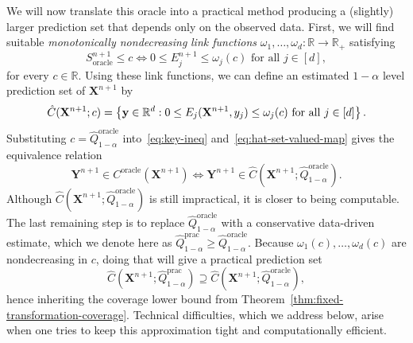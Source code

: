 {We will now translate this oracle into a practical method producing a (slightly) larger prediction set that depends only on the observed data. 
First, we will find suitable {\em monotonically nondecreasing} {\em link functions} $\omega_1, \ldots, \omega_d : \mathbb{R} \to \mathbb{R}_+$ satisfying 
\begin{equation}
S_{\mathrm{oracle}}^{n+1} \le c 
\iff 
0\leq {E}^{n+1}_j \le \omega_j(c)\text{ for all } j \in [d],
\label{eq:key-ineq}
\end{equation}
for every $c \in \mathbb{R}$. Using these link functions, we can define an estimated $1-\alpha$ level prediction set of $\mathbf{X}^{n+1}$ by
\begin{equation}
\hat{C}(\mathbf{X}^{n+1}; c) = \left\{\mathbf y \in \mathbb{R}^d: 0\leq E_j(\mathbf{X}^{n+1}, y_j) \leq \omega_j(c)\text{ for all } j \in [d]\right\}.  
\label{eq:hat-set-valued-map}
\end{equation}
Substituting $c = \hat{Q}^{\mathrm{oracle}}_{1-\alpha}$ into~\eqref{eq:key-ineq} and~\eqref{eq:hat-set-valued-map} gives the equivalence relation
\begin{equation} \label{eq:oracle-dual}
\mathbf{Y}^{n+1} \in {C}^{\mathrm{oracle}}(\mathbf{X}^{n+1}) \iff \mathbf{Y}^{n+1} \in \hat{C}(\mathbf{X}^{n+1}; \hat{Q}^{\mathrm{oracle}}_{1-\alpha}).
\end{equation}
Although $\hat{C}(\mathbf{X}^{n+1}; \hat{Q}^{\mathrm{oracle}}_{1-\alpha})$ is still impractical, it is closer to being computable.
The last remaining step is to replace $\hat{Q}^{\mathrm{oracle}}_{1-\alpha}$ with a conservative data-driven estimate, which we denote here as $\hat{Q}^\mathrm{prac}_{1-\alpha} \geq \hat{Q}^{\mathrm{oracle}}_{1-\alpha}$. Because $\omega_1(c),\ldots,\omega_d(c)$ are nondecreasing in $c$, doing that will give a practical prediction set
\begin{equation} \label{eq:trans-oracle-upper-bound}
\hat{C}(\mathbf{X}^{n+1}; \hat{Q}^\mathrm{prac}_{1-\alpha})
\supseteq \hat{C}(\mathbf{X}^{n+1}; \hat{Q}^{\mathrm{oracle}}_{1-\alpha}),
\end{equation}
hence inheriting the coverage lower bound from Theorem~\ref{thm:fixed-transformation-coverage}.}
Technical difficulties, which we address below, arise when one tries to keep this approximation tight and computationally efficient.

